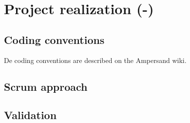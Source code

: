 \section{Project realization (-)}
\label{sec:project-realization}
\subsection{Coding conventions}
De coding conventions are described on the Ampersand wiki\cite{ampersand-wiki}.

\subsection{Scrum approach}
\lipsum[1]
\subsection{Validation}
\lipsum[1]